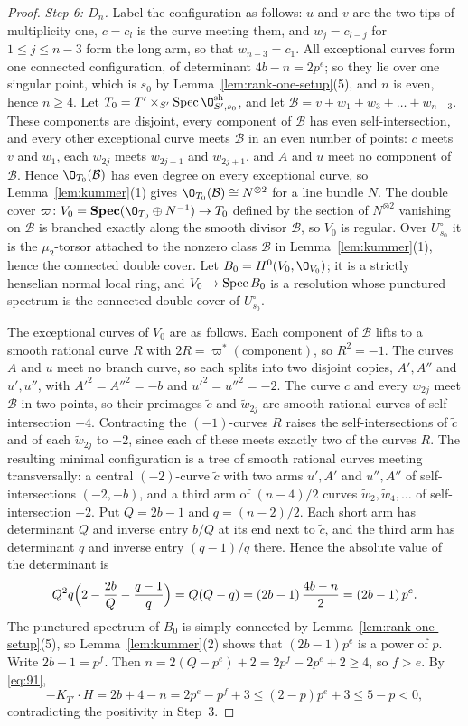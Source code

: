 \begin{proof}
\emph{Step 6: $D_n$.}
Label the configuration as follows: $u$ and $v$ are the two tips of multiplicity one, $c = c_l$ is the curve meeting them, and $w_j = c_{l-j}$ for $1\leq j\leq n-3$ form the long arm, so that $w_{n-3} = c_1$.
All exceptional curves form one connected configuration, of determinant $4b-n = 2p^e$; so they lie over one singular point, which is $s_0$ by Lemma~\ref{lem:rank-one-setup}(5), and $n$ is even, hence $n\geq 4$.
Let $T_0 = T'\times_{S'}\Spec\O^{\rm sh}_{S',s_0}$, and let $\mathcal B = v+w_1+w_3+\dots+w_{n-3}$.
These components are disjoint, every component of $\mathcal B$ has even self-intersection, and every other exceptional curve meets $\mathcal B$ in an even number of points: $c$ meets $v$ and $w_1$, each $w_{2j}$ meets $w_{2j-1}$ and $w_{2j+1}$, and $A$ and $u$ meet no component of $\mathcal B$.
Hence $\O_{T_0}(\mathcal B)$ has even degree on every exceptional curve, so Lemma~\ref{lem:kummer}(1) gives $\O_{T_0}(\mathcal B)\cong N^{\otimes 2}$ for a line bundle $N$.
The double cover $\varpi\from V_0 = \operatorname{\mathbf{Spec}}(\O_{T_0}\oplus N^{-1})\to T_0$ defined by the section of $N^{\otimes 2}$ vanishing on $\mathcal B$ is branched exactly along the smooth divisor $\mathcal B$, so $V_0$ is regular.
Over $U_{s_0}^\circ$ it is the $\mu_2$-torsor attached to the nonzero class $\mathcal B$ in Lemma~\ref{lem:kummer}(1), hence the connected double cover.
Let $B_0 = H^0(V_0,\O_{V_0})$; it is a strictly henselian normal local ring, and $V_0\to\operatorname{Spec} B_0$ is a resolution whose punctured spectrum is the connected double cover of $U_{s_0}^\circ$.

The exceptional curves of $V_0$ are as follows.
Each component of $\mathcal B$ lifts to a smooth rational curve $R$ with $2R = \varpi^*(\text{component})$, so $R^2 = -1$.
The curves $A$ and $u$ meet no branch curve, so each splits into two disjoint copies, $A',A''$ and $u',u''$, with $A'^2 = A''^2 = -b$ and $u'^2 = u''^2 = -2$.
The curve $c$ and every $w_{2j}$ meet $\mathcal B$ in two points, so their preimages $\tilde c$ and $\tilde w_{2j}$ are smooth rational curves of self-intersection $-4$.
Contracting the $(-1)$-curves $R$ raises the self-intersections of $\tilde c$ and of each $\tilde w_{2j}$ to $-2$, since each of these meets exactly two of the curves $R$.
The resulting minimal configuration is a tree of smooth rational curves meeting transversally: a central $(-2)$-curve $\tilde c$ with two arms $u',A'$ and $u'',A''$ of self-intersections $(-2,-b)$, and a third arm of $(n-4)/2$ curves $\tilde w_2,\tilde w_4,\dots$ of self-intersection $-2$.
Put $Q = 2b-1$ and $q = (n-2)/2$.
Each short arm has determinant $Q$ and inverse entry $b/Q$ at its end next to $\tilde c$, and the third arm has determinant $q$ and inverse entry $(q-1)/q$ there.
Hence the absolute value of the determinant is
\[
  Q^2q\Bigl(2-\frac{2b}{Q}-\frac{q-1}{q}\Bigr) = Q(Q-q) = (2b-1)\,\frac{4b-n}{2} = (2b-1)\,p^e.
\]
The punctured spectrum of $B_0$ is simply connected by Lemma~\ref{lem:rank-one-setup}(5), so Lemma~\ref{lem:kummer}(2) shows that $(2b-1)p^e$ is a power of $p$.
Write $2b-1 = p^f$.
Then $n = 2(Q-p^e)+2 = 2p^f-2p^e+2\geq 4$, so $f>e$.
By \eqref{eq:91},
\[
  -K_{T'}\cdot H = 2b+4-n = 2p^e-p^f+3\leq(2-p)p^e+3\leq 5-p<0,
\]
contradicting the positivity in Step~3.


\end{proof}
